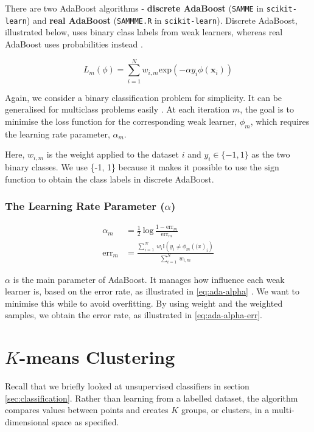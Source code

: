 There are two AdaBoost algorithms - \textbf{discrete AdaBoost} (\texttt{SAMME} in \texttt{scikit-learn}) and \textbf{real AdaBoost} (\texttt{SAMMME.R} in \texttt{scikit-learn}). Discrete AdaBoost, illustrated below, uses binary class labels from weak learners, whereas real AdaBoost uses probabilities instead \cite{mur-book}.

\begin{equation} \label{eq:ada-optimise}
  L_m(\phi) = \sum_{i=1}^{N} w_{i,m} \mathrm{exp}(-\alpha y_i \phi(\mathbf{x}_i))
\end{equation}

Again, we consider a binary classification problem for simplicity. It can be generalised for multiclass problems easily \cite{mur-book}. At each iteration $m$, the goal is to minimise the loss function for the corresponding weak learner, $\phi_m$, which requires the learning rate parameter, $\alpha_m$. 

Here, $w_{i,m}$ is the weight applied to the dataset $i$ and $y_i \in \{-1, 1\}$ as the two binary classes. We use \{-1, 1\} because it makes it possible to use the $\mathrm{sign}$ function to obtain the class labels in discrete AdaBoost.

\subsubsection{The Learning Rate Parameter ($\alpha$)} 

\begin{align}
  \alpha_m &= \frac{1}{2} \: \mathrm{log} \, \frac{1-\mathrm{err}_m}{\mathrm{err}_m}
  \label{eq:ada-alpha} \\
  \mathrm{err}_m &= \frac{\sum_{i=1}^N \: w_i \mathbb{I}(y_i \neq \phi_m(\mathbf(x)_i)}{\sum_{i=1}^{N} \: w_{i,m}}
  \label{eq:ada-alpha-err}
\end{align}


$\alpha$ is the main parameter of AdaBoost. It manages how influence each weak learner is, based on the error rate, as illustrated in \autoref{eq:ada-alpha} \cite{ada-improved}. We want to minimise this while to avoid overfitting. By using weight and the weighted samples, we obtain the error rate, as illustrated in \autoref{eq:ada-alpha-err}.






\newpage
\section{$K$-means Clustering} \label{sec:tech-kmeans}
Recall that we briefly looked at unsupervised classifiers in section \ref{sec:classification}. Rather than learning from a labelled dataset, the algorithm compares values between points and creates $K$ groups, or clusters, in a multi-dimensional space as specified.

